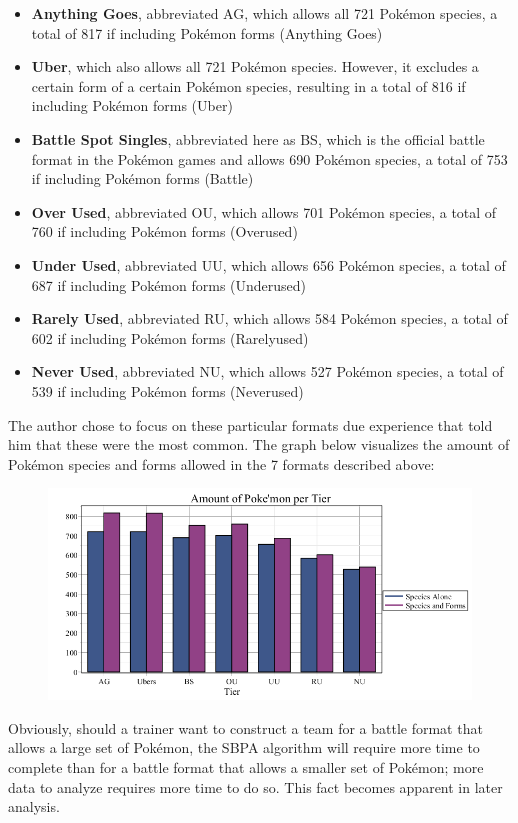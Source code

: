 \documentclass{article}
\begin{document}
\begin{itemize}
	\item \textbf{Anything Goes}, abbreviated AG, which allows all 721 Pok\'emon species, a total of 817 if including Pok\'emon forms (Anything Goes)
	\item \textbf{Uber}, which also allows all 721 Pok\'emon species. However, it excludes a certain form of a certain Pok\'emon species, resulting in a total of 816 if including Pok\'emon forms (Uber)
	\item \textbf{Battle Spot Singles}, abbreviated here as BS, which is the official battle format in the Pok\'emon games and allows 690 Pok\'emon species, a total of 753 if including Pok\'emon forms (Battle)
	\item \textbf{Over Used}, abbreviated OU, which allows 701 Pok\'emon species, a total of 760 if including Pok\'emon forms (Overused)
	\item \textbf{Under Used}, abbreviated UU, which allows 656 Pok\'emon species, a total of 687 if including Pok\'emon forms (Underused)
	\item \textbf{Rarely Used}, abbreviated RU, which allows 584 Pok\'emon species, a total of 602 if including Pok\'emon forms (Rarelyused)
	\item \textbf{Never Used}, abbreviated NU, which allows 527 Pok\'emon species, a total of 539 if including Pok\'emon forms (Neverused)
\end{itemize}
The author chose to focus on these particular formats due experience that told him that these were the most common.
The graph below visualizes the amount of Pok\'emon species and forms allowed in the 7 formats described above:
\begin{figure}[H]
	\includegraphics[width=\textwidth]{TierAmount.png}
	\centering
	\caption{}\label{TierAmountGraph}
\end{figure}
Obviously, should a trainer want to construct a team for a battle format that allows a large set of Pok\'emon, the SBPA algorithm will require more time to complete than for a battle format that allows a smaller set of Pok\'emon; more data  to analyze requires more time to do so. This fact becomes apparent in later analysis.\\\\
\end{document}
